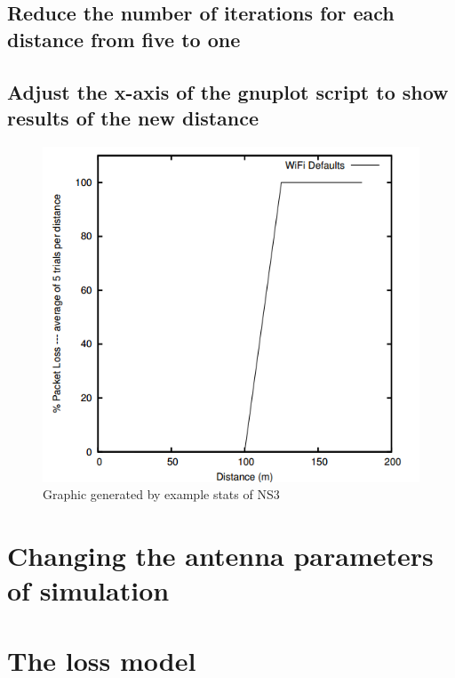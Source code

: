 \documentclass[a4paper,10pt]{article}
\begin{document}
\subsection{Reduce the number of iterations for each distance from five to one}

\subsection{Adjust the x-axis of the gnuplot script to show results of the new distance}

\begin{figure}[h]
        	\centering
    \includegraphics[scale=0.75]{basegraph.png}
    \caption{Graphic generated by example stats of NS3}
    \label{fig:inicio}
        \end{figure}


\section{Changing the antenna parameters of simulation}

\section{The loss model}
\end{document}

